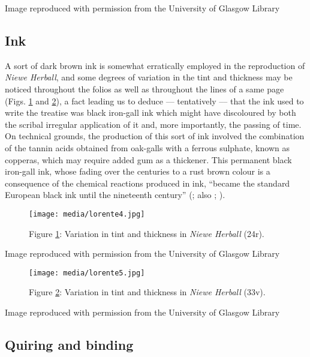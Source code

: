 \documentclass{article}
\begin{document}
 Image reproduced with permission from the University of Glasgow Library 


 
\subsection{Ink}

A sort of dark brown ink is somewhat erratically employed in the
reproduction of \emph{Niewe Herball}, and some degrees of variation in
the tint and thickness may be noticed throughout the folios as well as
throughout the lines of a same page (Figs. \ref{fig:lorente4} and \ref{fig:lorente5}), a fact leading us to
deduce –– tentatively –– that the ink used to write the
treatise was black iron-gall ink which might have discoloured by both
the scribal irregular application of it and, more importantly, the
passing of time. On technical grounds, the production of this sort of
ink involved the combination of the tannin acids obtained from oak-galls
with a ferrous sulphate, known as copperas, which may require added gum
as a thickener. This permanent black iron-gall ink, whose fading over
the centuries to a rust brown colour is a consequence of the chemical
reactions produced in ink, ``became the standard European black ink
until the nineteenth century'' (\cite[149--150]{mathisen_palaeography_2008}; also \cite[7]{petti_english_1977}; \cite[32]{de_hamel_scribes_1992}).

\begin{figure}[H]
  \centering
    \texttt{[image: media/lorente4.jpg]}
    \caption{Figure \ref{fig:lorente4}: Variation in tint and thickness in \emph{Niewe Herball} (24r).}
    \label{fig:lorente4}
  \end{figure}


 Image reproduced with permission from the University of Glasgow Library 


 
  \begin{figure}
    \texttt{[image: media/lorente5.jpg]}
    \caption{Figure \ref{fig:lorente5}: Variation in tint and thickness in \emph{Niewe Herball} (33v).}
    \label{fig:lorente5}
\end{figure}


 Image reproduced with permission from the University of Glasgow Library 


 
\subsection{Quiring and binding}
\end{document}
